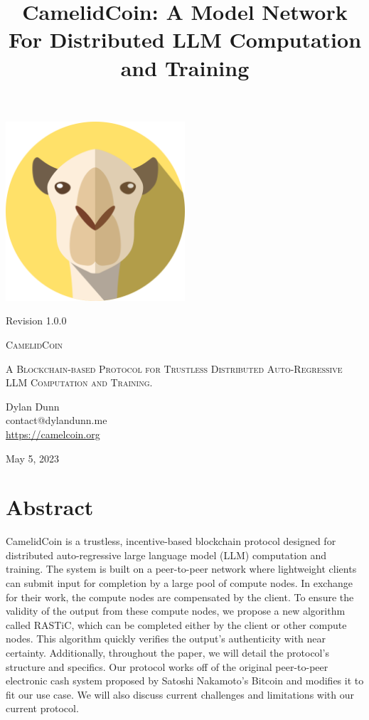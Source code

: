 \documentclass{article}
\title{CamelidCoin: A Model Network For Distributed LLM Computation and Training}
\begin{document}

\begin{titlepage}
    \centering
    \includegraphics[width=0.5\textwidth]{logoLarge.png}\par\vspace{.5cm}
    {\small Revision 1.0.0 \\}
    \vspace{1cm}
    {\fontsize{40}{48}\selectfont\scshape CamelidCoin\par}
    \vspace{1cm}
    {\scshape\Large A Blockchain-based Protocol for Trustless Distributed Auto-Regressive LLM Computation and Training. \par}
    \vspace{2cm}
    {\Large Dylan Dunn \\}
    {\Large contact@dylandunn.me \\}
    \vspace{1cm}
    \url{https://camelcoin.org}
    \vspace{0.5cm}
    \vfill
    {\large May 5, 2023\par}
  \end{titlepage}

\section{Abstract}
CamelidCoin is a trustless, incentive-based blockchain protocol designed for distributed auto-regressive large language model (LLM) computation and training. 
The system is built on a peer-to-peer network where lightweight clients can submit input for completion by a large pool of compute nodes. 
In exchange for their work, the compute nodes are compensated by the client. 
To ensure the validity of the output from these compute nodes, we propose a new algorithm called \ac{RASTiC}, which can be completed either by the client or other compute nodes. 
This algorithm quickly verifies the output's authenticity with near certainty. 
Additionally, throughout the paper, we will detail the protocol's structure and specifics.
Our protocol works off of the original peer-to-peer electronic cash system proposed by Satoshi Nakamoto's Bitcoin and modifies it to fit our use case. 
We will also discuss current challenges and limitations with our current protocol.
\end{document}
